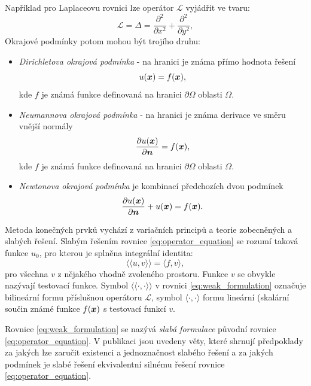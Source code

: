 \documentclass[12pt,a4paper,oneside]{article}
\numberwithin{equation}{section} %
\numberwithin{figure}{section} %
\numberwithin{table}{section} %
\renewcommand{\vec}[1]{\mbox{\boldmath$#1$}} %
\begin{document}
Například pro Laplaceovu rovnici lze operátor $\mathcal{L}$ vyjádřit ve tvaru:
\begin{equation}
\mathcal{L} = \Delta = \frac{\partial^2}{\partial x^2} +   \frac{\partial^2}{\partial y^2},
\label{eq:laplace_equation}
\end{equation}
Okrajové podmínky potom mohou být trojího druhu:
\begin{itemize}
\item \emph{Dirichletova okrajová podmínka} - na hranici je známa přímo hodnota řešení 
\begin{equation}
u(\vec{x}) = f(\vec{x}), 
\end{equation}
kde $f$ je známá funkce definovaná na hranici $\partial \Omega$ oblasti $\Omega$.
\item \emph{Neumannova okrajová podmínka} - na hranici je známa derivace ve směru vnější normály    
\begin{equation}
\frac{\partial u(\vec{x})}{\partial \vec{n}} = f(\vec{x}), 
\end{equation}
kde $f$ je známá funkce definovaná na hranici $\partial \Omega$ oblasti $\Omega$.
\item \emph{Newtonova okrajová podmínka} je kombinací předchozích dvou podmínek
\begin{equation}
\frac{\partial u(\vec{x})}{\partial \vec{n}} + u(\vec{x}) = f(\vec{x}). 
\end{equation}
\end{itemize}   
Metoda konečných prvků vychází z variačních principů a teorie zobecněných a slabých řešení.
Slabým řešením rovnice \ref{eq:operator_equation} se rozumí taková funkce $u_0$, pro kterou je splněna integrální identita:
\begin{equation}
\langle\langle u, v \rangle\rangle = \langle f, v \rangle,	
\label{eq:weak_formulation}
\end{equation}
pro všechna $v$ z nějakého vhodně zvoleného prostoru. Funkce $v$ se obvykle nazývají testovací funkce. Symbol $\langle\langle \cdot, \cdot \rangle\rangle$ v rovnici \ref{eq:weak_formulation} označuje bilineární formu příslušnou operátoru $\mathcal{L}$, symbol $\langle \cdot, \cdot \rangle$ formu lineární (skalární součin známé funkce $f(\vec{x})$ s testovací funkcí $v$.
 
Rovnice \ref{eq:weak_formulation} se nazývá \emph{slabá formulace} původní rovnice \ref{eq:operator_equation}. V publikaci \cite{Rektorys} jsou uvedeny věty, které shrnují předpoklady za jakých lze zaručit existenci a jednoznačnost slabého řešení a za jakých podmínek je slabé řešení ekvivalentní silnému řešení rovnice \ref{eq:operator_equation}.
\end{document}
